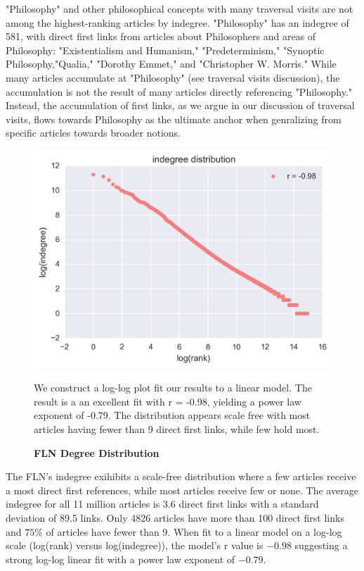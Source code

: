 \documentclass[pre,twocolumn,twoside,superscriptaddress,floatfix, aps, 10pt]{revtex4-1}
\begin{document}
"Philosophy" and other philosophical concepts with many traversal visits
are not among the highest-ranking articles by indegree.
"Philosophy" has an indegree of 581, with direct first links from articles about Philosophers and areas of Philosophy: "Existentialism and Humanism," "Predeterminism," "Synoptic Philosophy,"Qualia," "Dorothy Emmet," and "Christopher W. Morris."
While many articles accumulate at "Philosophy" (see traversal visits discussion), 
the accumulation is not the 
result of many articles directly referencing "Philosophy." 
Instead, the accumulation of first links, as we argue in our 
discussion of traversal visits, flows towards Philosophy as the 
ultimate anchor when genralizing from specific articles towards broader notions.
\begin{figure}[tp!]
  \centering	
  \includegraphics[width=\columnwidth]{graphics/ndegree_loglog.png}
  \caption{
    \textbf{FLN Degree Distribution}
  }
  We construct a log-log plot fit our results to a linear model. The result is a 
  an excellent fit with r = -0.98, yielding a power law exponent of -0.79. 
  The distribution appears scale free with most articles having fewer than 9 
  direct first links, while few hold most.
  \label{fig:degree distribution}
\end{figure}
The FLN's indegree exihibits a scale-free distribution where a few articles 
receive a most direct first references, while most articles receive few or none.
The average indegree for all 11 million articles is 3.6 direct first links with a standard deviation of 89.5 links.
Only 4826 articles have more than 100 direct first links and $75\%$ of articles
have fewer than 9. 
When fit to a linear model on a log-log scale (log(rank) versus log(indegree)), 
the model's r value is $-0.98$ suggesting a strong log-log linear fit 
with a power law exponent of $-0.79$. 
\end{document}
